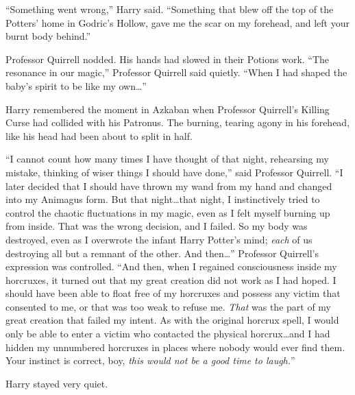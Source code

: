“Something went wrong,” Harry said. “Something that blew off the top of the
Potters’ home in Godric’s Hollow, gave me the scar on my forehead, and left
your burnt body behind.”

Professor Quirrell nodded. His hands had slowed in their Potions work. “The
resonance in our magic,” Professor Quirrell said quietly. “When I had shaped
the baby’s spirit to be like my own…”

Harry remembered the moment in Azkaban when Professor Quirrell’s Killing Curse
had collided with his Patronus. The burning, tearing agony in his forehead,
like his head had been about to split in half.

“I cannot count how many times I have thought of that night, rehearsing my
mistake, thinking of wiser things I should have done,” said Professor Quirrell.
“I later decided that I should have thrown my wand from my hand and changed
into my Animagus form. But that night…that night, I instinctively tried
to control the chaotic fluctuations in my magic, even as I felt myself burning
up from inside. That was the wrong decision, and I failed. So my body was
destroyed, even as I overwrote the infant Harry Potter’s mind; \emph{each} of
us destroying all but a remnant of the other. And then…” Professor
Quirrell’s expression was controlled. “And then, when I regained consciousness
inside my horcruxes, it turned out that my great creation did not work as I had
hoped. I should have been able to float free of my horcruxes and possess any
victim that consented to me, or that was too weak to refuse me. \emph{That} was
the part of my great creation that failed my intent. As with the original
horcrux spell, I would only be able to enter a victim who contacted the
physical horcrux…and I had hidden my unnumbered horcruxes in places
where nobody would ever find them. Your instinct is correct, boy, \emph{this
would not be a good time to laugh.}”

Harry stayed very quiet.

